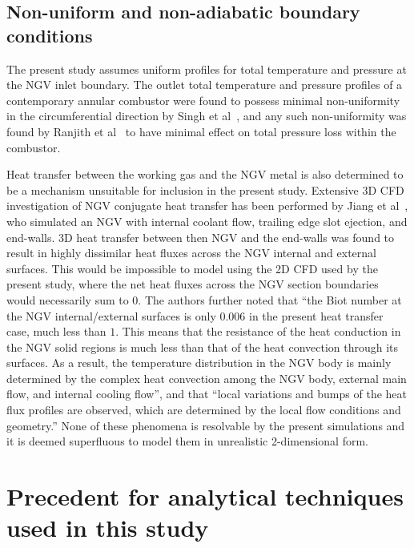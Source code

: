 \documentclass[a4paper, 11pt, oneside]{report}
\begin{document}
\subsection{Non-uniform and non-adiabatic boundary conditions}

The present study assumes uniform profiles for total temperature and pressure at the NGV inlet boundary. The outlet total temperature and pressure profiles of a contemporary annular combustor were found to possess minimal non-uniformity in the circumferential direction by Singh et al~\cite{singh_annular_combustors}, and any such non-uniformity was found by Ranjith et al~\cite{ranjith_annular_combustors} to have minimal effect on total pressure loss within the combustor. 

Heat transfer between the working gas and the NGV metal is also determined to be a mechanism unsuitable for inclusion in the present study. Extensive 3D CFD investigation of NGV conjugate heat transfer has been performed by Jiang et al~\cite{jiang_heat_transfer}, who simulated an NGV with internal coolant flow, trailing edge slot ejection, and end-walls. 3D heat transfer between then NGV and the end-walls was found to result in highly dissimilar heat fluxes across the NGV internal and external surfaces. This would be impossible to model using the 2D CFD used by the present study, where the net heat fluxes across the NGV section boundaries would necessarily sum to $0$. The authors further noted that ``the Biot number at the NGV internal/external surfaces is only $0.006$ in the present heat transfer case, much less than $1$. This means that the resistance of the heat conduction in the NGV solid regions is much less than that of the heat convection through its surfaces. As a result, the temperature distribution in the NGV body is mainly determined by the complex heat convection among the NGV body, external main flow, and internal cooling flow'', and that ``local variations and bumps of the heat flux profiles are observed, which are determined by the local flow conditions and geometry.'' None of these phenomena is resolvable by the present simulations and it is deemed superfluous to model them in unrealistic 2-dimensional form.


\section{Precedent for analytical techniques used in this study}
\label{precedent_for_analytical_techniques_used_in_this_study}
\end{document}
